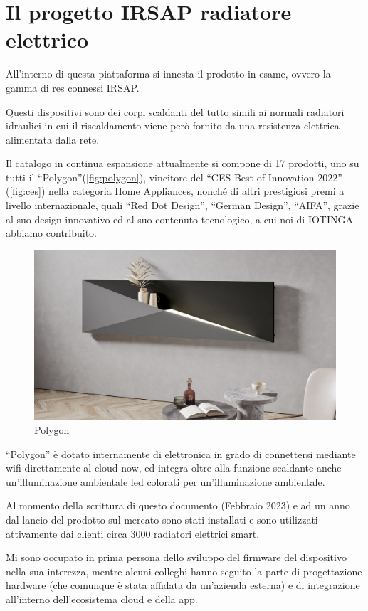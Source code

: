 \documentclass[12pt,a4paper,twoside,titlepage]{book}
\begin{document}
\section{Il progetto IRSAP radiatore elettrico}

All'interno di questa piattaforma si innesta il prodotto in esame,
ovvero la gamma di \glspl{re} connessi IRSAP.

Questi dispositivi sono dei corpi scaldanti del tutto simili ai normali radiatori
idraulici in cui il riscaldamento viene però fornito da una resistenza elettrica
alimentata dalla rete.

Il catalogo in continua espansione attualmente si compone di 17 prodotti, 
uno su tutti il ``Polygon''(\autoref{fig:polygon}), vincitore del
``CES Best of Innovation 2022'' (\autoref{fig:ces}) nella categoria Home Appliances,
nonché di altri prestigiosi premi a livello internazionale, quali ``Red Dot Design'',
``German Design'', ``AIFA'',
grazie al suo design innovativo ed al suo contenuto tecnologico,
a cui noi di IOTINGA abbiamo contribuito.

\begin{figure}[ht]
    \centering
    \includegraphics[width=12cm]{img/polygon.jpeg}
    \caption{Polygon}
    \label{fig:polygon}
\end{figure}

``Polygon'' è dotato internamente di elettronica in grado di connettersi mediante
\Gls{wifi} direttamente al cloud \Gls{now}, ed integra oltre alla funzione scaldante
anche un'illuminazione ambientale \acrshort{led} colorati per un'illuminazione ambientale.

Al momento della scrittura di questo documento (Febbraio 2023) e ad un anno dal lancio
del prodotto sul mercato sono stati installati e sono utilizzati attivamente dai clienti
circa $3000$ radiatori elettrici smart.

Mi sono occupato in prima persona dello sviluppo del \gls{firmware} del dispositivo nella
sua interezza, mentre alcuni colleghi hanno seguito la parte di progettazione hardware
(che comunque è stata affidata da un'azienda esterna) e di integrazione all'interno
dell'ecosistema cloud e della app.
\end{document}
